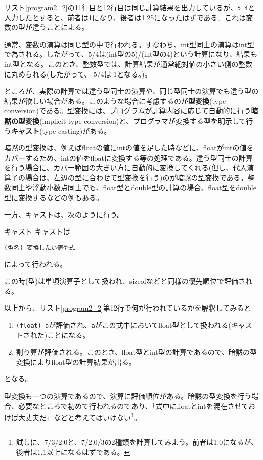 リスト\ref{program2_2}の11行目と12行目は同じ計算結果を出力しているが、\verb|5 4|と入力したとすると、前者は1になり、後者は1.25になったはずである。これは変数の型が違うことによる。

通常、変数の演算は同じ型の中で行われる。すなわち、int型同士の演算はint型で為される。したがって、5/4は(int型の5)/(int型の4)という計算になり、結果もint型となる。このとき、整数型では、計算結果が通常絶対値の小さい側の整数に丸められる(したがって、-5/4は-1となる。)。

ところが、実際の計算では違う型同士の演算や、同じ型同士の演算でも違う型の結果が欲しい場合がある。このような場合に考慮するのが\textbf{型変換}(type conversion)である。型変換には、プログラムが計算内容に応じて自動的に行う\textbf{暗黙の型変換}(implicit type conversion)と、プログラマが変換する型を明示して行う\textbf{キャスト}(type casting)がある。

暗黙の型変換は、例えばfloatの値にintの値を足した時などに、floatがintの値をカバーするため、intの値をfloatに変換する等の処理である。違う型同士の計算を行う場合に、カバー範囲の大きい方に自動的に変換してくれる(但し、代入演算子の場合は、左辺の型に合わせて型変換を行う)のが暗黙の型変換である。整数同士や浮動小数点同士でも、float型とdouble型の計算の場合、float型をdouble型に変換するなどの例もある。

一方、キャストは、次のように行う。
\begin{itembox}[l]{キャスト}
キャストは
\begin{center}
\verb|(型名) 変換したい値や式|
\end{center}
\begin{flushright}
によって行われる。
\end{flushright}
\end{itembox}
この時(型)は単項演算子として扱われ、sizeofなどと同様の優先順位で評価される。

以上から、リスト\ref{program2_2}第12行で何が行われているかを解釈してみると
\begin{enumerate}
\item \verb|(float) a|が評価され、\verb|a|がこの式中においてfloat型として扱われる(キャストされた)ことになる。
\item 割り算が評価される。このとき、float型とint型の計算であるので、暗黙の型変換によりfloat型の計算結果が出る。
\end{enumerate}
となる。

型変換も一つの演算であるので、演算に評価順位がある。暗黙の型変換を行う場合、必要なところで初めて行われるのであり、「式中にfloatとintを混在させておけば大丈夫だ」などと考えてはいけない\footnote{試しに、7/3/2.0と、7/2.0/3の2種類を計算してみよう。前者は1.0になるが、後者は1.1以上になるはずである。}。

